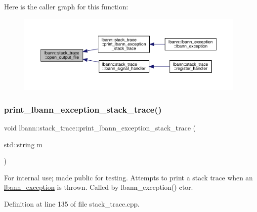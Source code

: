 Here is the caller graph for this function\+:\nopagebreak
\begin{figure}[H]
\begin{center}
\leavevmode
\includegraphics[width=350pt]{namespacelbann_1_1stack__trace_aa071d75a81128e2a8100d66529482842_icgraph}
\end{center}
\end{figure}
\mbox{\label{namespacelbann_1_1stack__trace_ae7396b3b0ee5d087a045f04ce690cae4}} 
\subsubsection{\texorpdfstring{print\+\_\+lbann\+\_\+exception\+\_\+stack\+\_\+trace()}{print\_lbann\_exception\_stack\_trace()}}
{\footnotesize\ttfamily void lbann\+::stack\+\_\+trace\+::print\+\_\+lbann\+\_\+exception\+\_\+stack\+\_\+trace (\begin{DoxyParamCaption}\item[{std\+::string}]{m }\end{DoxyParamCaption})}

For internal use; made public for testing. Attempts to print a stack trace when an \hyperlink{classlbann_1_1lbann__exception}{lbann\+\_\+exception} is thrown. Called by lbann\+\_\+exception() ctor. 

Definition at line 135 of file stack\+\_\+trace.\+cpp.


